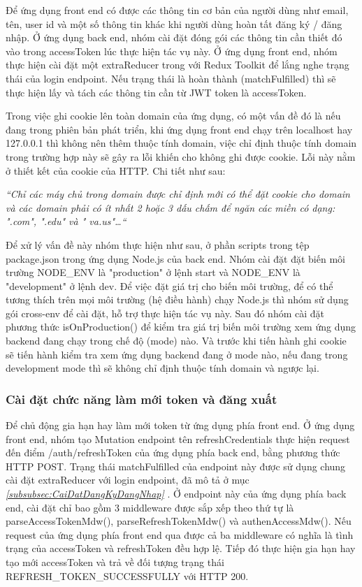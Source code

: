 Để ứng dụng front end có được các thông tin cơ bản của người dùng như email, tên, user id và một số thông tin khác khi người dùng hoàn tất đăng ký / đăng nhập.
Ở ứng dụng back end, nhóm cài đặt đóng gói các thông tin cần thiết đó vào trong accessToken lúc thực hiện tác vụ này.
Ở ứng dụng front end, nhóm thực hiện cài đặt một extraReducer trong với Redux Toolkit để lắng nghe trạng thái của login endpoint.
Nếu trạng thái là hoàn thành (matchFulfilled) thì sẽ thực hiện lấy và tách các thông tin cần từ JWT token là accessToken.

Trong việc ghi cookie lên toàn domain của ứng dụng, có một vấn đề đó là nếu đang trong phiên bản phát triển, khi ứng dụng front end chạy trên localhost hay 127.0.0.1 thì không nên thêm thuộc tính domain, việc chỉ định thuộc tính domain trong trường hợp này sẽ gây ra lỗi khiến cho không ghi được cookie. Lỗi này nằm ở thiết kết của cookie của HTTP. Chi tiết như sau:

\textit{“Chỉ các máy chủ trong domain được chỉ định mới có thể đặt cookie cho domain và các domain phải có ít nhất 2 hoặc 3 dấu chấm để ngăn các miền có dạng: ".com", ".edu" và " va.us"…“} \cite{chap4bib4}

Để xử lý vấn đề này nhóm thực hiện như sau, ở phần scripts trong tệp package.json trong ứng dụng Node.js của back end.
Nhóm cài đặt đặt biến môi trường NODE\_ENV là "production" ở lệnh start và NODE\_ENV là "development" ở lệnh dev.
Để việc đặt giá trị cho biến môi trường, để có thể tương thích trên mọi môi trường (hệ điều hành) chạy Node.js thì nhóm sử dụng gói cross-env để cài đặt, hỗ trợ thực hiện tác vụ này. Sau đó nhóm cài đặt phương thức isOnProduction() để kiểm tra giá trị biến môi trường xem ứng dụng backend đang chạy trong chế độ (mode) nào. Và trước khi tiến hành ghi cookie sẽ tiến hành kiểm tra xem ứng dụng backend đang ở mode nào, nếu đang trong development mode thì sẽ không chỉ định thuộc tính domain và ngược lại.

\subsubsection{Cài đặt chức năng làm mới token và đăng xuất}

\tab Để chủ động gia hạn hay làm mới token từ ứng dụng phía front end.
Ở ứng dụng front end, nhóm tạo Mutation endpoint tên refreshCredentials thực hiện request đến điểm /auth/refreshToken của ứng dụng phía back end, bằng phương thức HTTP POST.
Trạng thái matchFulfilled của endpoint này được sử dụng chung cài đặt extraReducer với login endpoint, đã mô tả ở mục \textit{\ref{subsubsec:CaiDatDangKyDangNhap} }.
Ở endpoint này của ứng dụng phía back end, cài đặt chỉ bao gồm 3 middleware được sắp xếp theo thứ tự là parseAccessTokenMdw(), parseRefreshTokenMdw() và authenAccessMdw().
Nếu request của ứng dụng phía front end qua được cả ba middleware có nghĩa là tình trạng của accessToken và refreshToken đều hợp lệ.
Tiếp đó thực hiện gia hạn hay tạo mới accessToken và trả về đối tượng trạng thái REFRESH\_TOKEN\_SUCCESSFULLY với HTTP 200.

